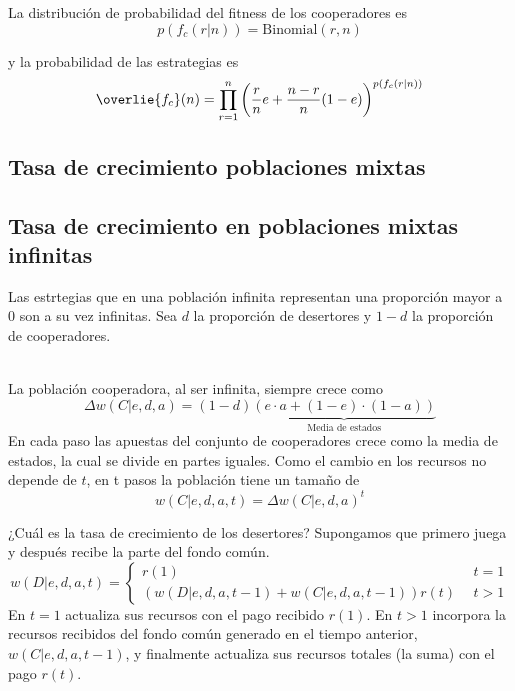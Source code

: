 \documentclass[a4paper,10pt]{article}
\begin{document}
La distribución de probabilidad del fitness de los cooperadores es
\begin{equation}
p(f_c(r|n)) = \text{Binomial}(r,n)
\end{equation}

y la probabilidad de las estrategias es
\begin{equation}
\overlie{f_c}(n) = \prod_{r=1}^n \left( \frac{r}{n} e + \frac{n-r}{n}(1-e) \right)^{p(f_c(r|n))}
\end{equation}



\subsection{Tasa de crecimiento poblaciones mixtas}


\subsection{Tasa de crecimiento en poblaciones mixtas infinitas}

Las estrtegias que en una población infinita representan una proporción mayor a $0$ son a su vez infinitas.
Sea $d$ la proporción de desertores y $1-d$ la proporción de cooperadores.

\\

La población cooperadora, al ser infinita, siempre crece como
\begin{equation}
\Delta w(C|e,d,a) = (1-d) \underbrace{(e\cdot a + (1-e)\cdot(1-a))}_{\text{Media de estados}}
\end{equation}
En cada paso las apuestas del conjunto de cooperadores crece como la media de estados, la cual se divide en partes iguales.
Como el cambio en los recursos no depende de $t$, en t pasos la población tiene un tamaño de
\begin{equation}
w(C|e,d,a,t) = \Delta w(C|e,d,a)^t 
\end{equation}

¿Cuál es la tasa de crecimiento de los desertores?
Supongamos que primero juega y después recibe la parte del fondo común.
\begin{equation}
w(D|e,d,a,t) =
\begin{cases}
 r(1) & \ \  t=1 \\
 (w(D|e,d,a,t-1) + w(C|e,d,a,t-1)) r(t) & \ \  t>1
\end{cases}
\end{equation}
En $t=1$ actualiza sus recursos con el pago recibido $r(1)$.
En $t>1$ incorpora la recursos recibidos del fondo común generado en el tiempo anterior, $w(C|e,d,a,t-1)$, y finalmente actualiza sus recursos totales (la suma) con el pago $r(t)$.
\end{document}

